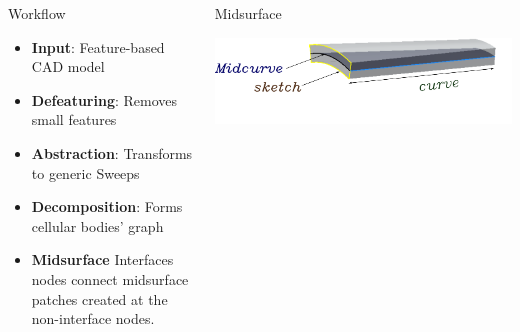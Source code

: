 \documentclass[final]{beamer}
\newlength{\onecolumnwidth}
\begin{document}
\begin{frame}[t]
\begin{columns}[t]
\begin{column}{\onecolumnwidth}
\begin{block}{Workflow}
\vspace{0.5em}

\begin{itemize}[noitemsep,nolistsep]
		\item \textbf{Input}: Feature-based CAD model
		\item \textbf{Defeaturing}: Removes small features
		\item \textbf{Abstraction}: Transforms to generic Sweeps
		\item \textbf{Decomposition}: Forms cellular bodies' graph
		\item \textbf{Midsurface} Interfaces nodes connect midsurface patches created at the non-interface nodes.
\end{itemize}
		
	\end{block}
	

		
\end{column}


\begin{column}{\onecolumnwidth} %

	\begin{block}{Midsurface}
		\begin{center}
			\includegraphics[width=0.9\linewidth]{../Common/images/MidsurfSmallProfile.pdf}
		\end{center}
		\vspace{-3.5em}
	\end{block}
	

\end{column}
\end{columns}
\end{frame}
\end{document}
